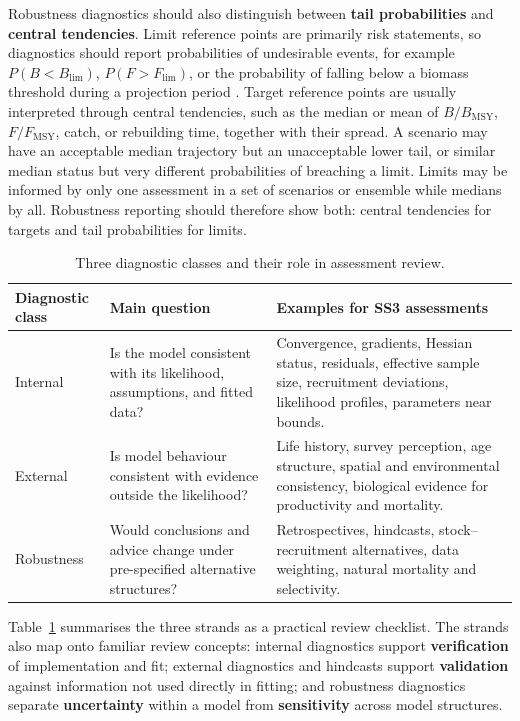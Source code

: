 \documentclass[11pt,a4paper]{article}
\begin{document}
Robustness diagnostics should also distinguish between \textbf{tail probabilities} and \textbf{central tendencies}. Limit reference points are primarily risk statements, so diagnostics should report probabilities of undesirable events, for example $P(B < B_{\mathrm{lim}})$, $P(F > F_{\mathrm{lim}})$, or the probability of falling below a biomass threshold during a projection period \citep{Roux2022,Fischer2023}. Target reference points are usually interpreted through central tendencies, such as the median or mean of $B/B_{\mathrm{MSY}}$, $F/F_{\mathrm{MSY}}$, catch, or rebuilding time, together with their spread. A scenario may have an acceptable median trajectory but an unacceptable lower tail, or similar median status but very different probabilities of breaching a limit. Limits may be informed by only one assessment in a set of scenarios or ensemble while medians by all. Robustness reporting should therefore show both: central tendencies for targets and tail probabilities for limits.

\begin{table}[H]
  \centering
  \caption{Three diagnostic classes and their role in assessment review.}
  \label{tab:diag-classes}
  \small
  \begin{tabularx}{\textwidth}{>{\raggedright\arraybackslash}p{3.0cm}>{\raggedright\arraybackslash}p{5.0cm}>{\raggedright\arraybackslash}X}
    \toprule
    Diagnostic class & Main question & Examples for SS3 assessments \\
    \midrule
    Internal & Is the model consistent with its likelihood, assumptions, and fitted data? & Convergence, gradients, Hessian status, residuals, effective sample size, recruitment deviations, likelihood profiles, parameters near bounds. \\
    External & Is model behaviour consistent with evidence outside the likelihood? & Life history, survey perception, age structure, spatial and environmental consistency, biological evidence for productivity and mortality. \\
    Robustness & Would conclusions and advice change under pre-specified alternative structures? & Retrospectives, hindcasts, stock--recruitment alternatives, data weighting, natural mortality and selectivity. \\
    \bottomrule
  \end{tabularx}
\end{table}

Table~\ref{tab:diag-classes} summarises the three strands as a practical review checklist. The strands also map onto familiar review concepts: internal diagnostics support \textbf{verification} of implementation and fit; external diagnostics and hindcasts support \textbf{validation} against information not used directly in fitting; and robustness diagnostics separate \textbf{uncertainty} within a model from \textbf{sensitivity} across model structures.
\end{document}
